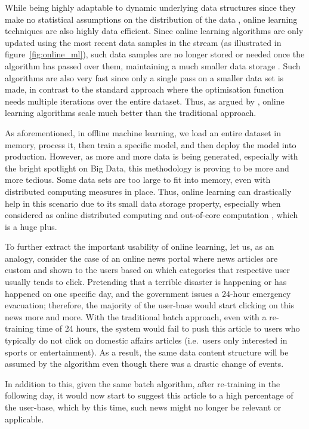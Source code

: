 While being highly adaptable to dynamic underlying data structures since they make no statistical assumptions on the distribution of the data \citep{hoi_libol:_2014}, online learning techniques are also highly data efficient. Since online learning algorithms are only updated using the most recent data samples in the stream (as illustrated in figure~\ref{fig:online_ml}), such data samples are no longer stored or needed once the algorithm has passed over them, maintaining a much smaller data storage \citep{oza_online_2005}. Such algorithms are also very fast since only a single pass on a smaller data set is made, in contrast to the standard approach where the optimisation function needs multiple iterations over the entire dataset. Thus, as argued by \citet{hoi_online_2018}, online learning algorithms scale much better than the traditional approach.

As aforementioned, in offline machine learning, we load an entire dataset in memory, process it, then train a specific model, and then deploy the model into production. However, as more and more data is being generated, especially with the bright spotlight on Big Data, this methodology is proving to be more and more tedious. Some data sets are too large to fit into memory, even with distributed computing measures in place. Thus, online learning can drastically help in this scenario due to its small data storage property, especially when considered as online distributed computing and out-of-core computation \citep{zhang_projection-free_2017}, which is a huge plus.

To further extract the important usability of online learning, let us, as an analogy, consider the case of an online news portal where news articles are custom and shown to the users based on which categories that respective user usually tends to click. Pretending that a terrible disaster is happening or has happened on one specific day, and the government issues a 24-hour emergency evacuation; therefore, the majority of the user-base would start clicking on this news more and more. With the traditional batch approach, even with a re-training time of 24 hours, the system would fail to push this article to users who typically do not click on domestic affairs articles (i.e.\ users only interested in sports or entertainment). As a result, the same data content structure will be assumed by the algorithm even though there was a drastic change of events. 

In addition to this, given the same batch algorithm, after re-training in the following day, it would now start to suggest this article to a high percentage of the user-base, which by this time, such news might no longer be relevant or applicable.

